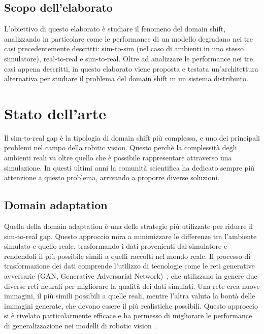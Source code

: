 \documentclass[12pt]{report}
\begin{document}
\section{Scopo dell'elaborato}
\label{sec:scopo_dell_elaborato}

L'obiettivo di questo elaborato è studiare il fenomeno del domain shift, analizzando in particolare come le performance di un modello degradano nei tre casi precedentemente descritti: sim-to-sim (nel caso di ambienti in uno stesso simulatore), real-to-real e sim-to-real. Oltre ad analizzare le performance nei tre casi appena descritti, in questo elaborato viene proposta e testata un'architettura alternativa per studiare il problema del domain shift in un sistema distribuito.

\chapter{Stato dell'arte}
\label{chap:stato_arte}

Il sim-to-real gap è la tipologia di domain shift più complessa, e uno dei principali problemi nel campo della robitic vision. Questo perchè la complessità degli ambienti reali va oltre quello che è possibile rappresentare attraverso una simulazione. In questi ultimi anni la comunità scientifica ha dedicato sempre più attenzione a questo problema, arrivando a proporre diverse soluzioni.

\section{Domain adaptation}
\label{sec:adaptation}

Quella della domain adaptation è una delle strategie più utilizzate per ridurre il sim-to-real gap. Questo approccio mira a minimizzare le differenze tra l'ambiente simulato e quello reale, trasformando i dati provenienti dal simulatore e rendendoli il più possibile simili a quelli raccolti nel mondo reale. Il processo di trasformazione dei dati comprende l'utilizzo di tecnologie come le reti generative avversarie (GAN, Generative Adversarial Network)~\cite{10.1145/3422622}, che utilizzano in genere due diverse reti neurali per migliorare la qualità dei dati simulati. Una rete crea nuove immagini, il più simili possibili a quelle reali, mentre l'altra valuta la bontà delle immagini generate, che devono essere il più realistiche possibili. Questo approccio si è rivelato particolarmente efficace e ha permesso di migliorare le performance di generalizzazione nei modelli di robotic vision~\cite{Shrivastava_2017_CVPR}.
\end{document}
